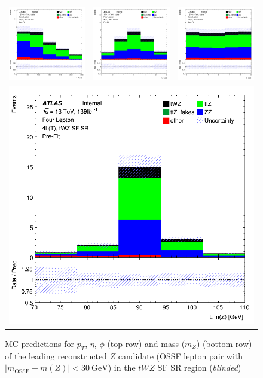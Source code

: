 \clearpage
\begin{figure}[htbp]
\centering
  \begin{tabular}{ccc}

    \includegraphics[width=.2\textwidth]{figures/PreFitPlots/lep4_tWZ_4T_SF_0_Z_pt}&
    \includegraphics[width=.2\textwidth]{figures/PreFitPlots/lep4_tWZ_4T_SF_0_Z_eta} &
    \includegraphics[width=.2\textwidth]{figures/PreFitPlots/lep4_tWZ_4T_SF_0_Z_phi} \\
    \multicolumn{3}{c}{\includegraphics[width=.2\textwidth]{figures/PreFitPlots/lep4_tWZ_4T_SF_0_Z_mass}}

  \end{tabular}
    \caption{MC predictions for $p_{T}$, $\eta$, $\phi$ (top row) and mass ($m_Z$) (bottom row) of the leading reconstructed $Z$ candidate (OSSF lepton pair with $|m_{\text{OSSF}} - m(Z)| <  \SI{30}{\GeV}$) in the $tWZ$ SF SR region (\textit{blinded})}
  \label{fig:4lep-SF-SR-ZCands-Plots}
\end{figure}





